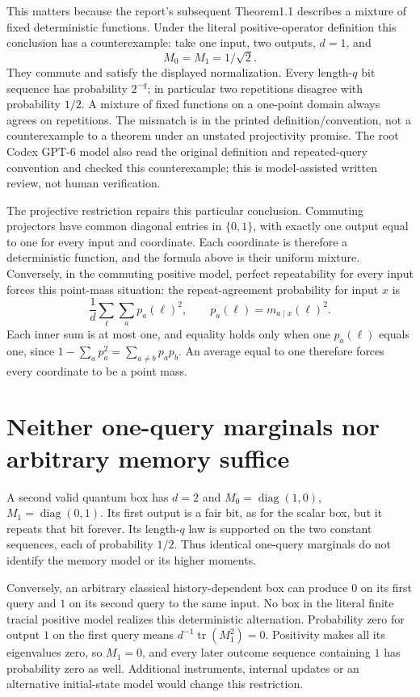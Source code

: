 \documentclass[11pt]{article}
\begin{document}
This matters because the report's subsequent Theorem1.1 describes
a mixture of fixed deterministic functions. Under the literal
positive-operator definition this conclusion has a counterexample:
take one input, two outputs, $d=1$, and
\[
 M_0=M_1=1/\sqrt2.
\]
They commute and satisfy the displayed normalization. Every
length-$q$ bit sequence has probability $2^{-q}$; in particular
two repetitions disagree with probability $1/2$. A mixture of
fixed functions on a one-point domain always agrees on repetitions.
The mismatch is in the printed definition/convention, not a
counterexample to a theorem under an unstated projectivity promise.
The root Codex GPT-6 model also read the original definition and
repeated-query convention and checked this counterexample; this
is model-assisted written review, not human verification.

The projective restriction repairs this particular conclusion.
Commuting projectors have common diagonal entries in $\{0,1\}$,
with exactly one output equal to one for every input and coordinate.
Each coordinate is therefore a deterministic function, and the
formula above is their uniform mixture. Conversely, in the
commuting positive model, perfect repeatability for every input
forces this point-mass situation: the repeat-agreement probability
for input $x$ is
\[
 \frac1d\sum_\ell\sum_a p_a(\ell)^2,
 \qquad p_a(\ell)=m_{a\mid x}(\ell)^2.
\]
Each inner sum is at most one, and equality holds only when one
$p_a(\ell)$ equals one, since
$1-\sum_a p_a^2=\sum_{a\ne b}p_ap_b$. An average equal to one
therefore forces every coordinate to be a point mass.

\section{Neither one-query marginals nor arbitrary memory suffice}
A second valid quantum box has $d=2$ and
$M_0=\operatorname{diag}(1,0)$,
$M_1=\operatorname{diag}(0,1)$. Its first output is a fair bit,
as for the scalar box, but it repeats that bit forever. Its
length-$q$ law is supported on the two constant sequences,
each of probability $1/2$. Thus identical one-query marginals
do not identify the memory model or its higher moments.

Conversely, an arbitrary classical history-dependent box can
produce $0$ on its first query and $1$ on its second query to
the same input. No box in the literal finite tracial positive
model realizes this deterministic alternation. Probability zero
for output $1$ on the first query means
$d^{-1}\operatorname{tr}(M_1^2)=0$. Positivity makes all its
eigenvalues zero, so $M_1=0$, and every later outcome sequence
containing $1$ has probability zero as well. Additional
instruments, internal updates or an alternative initial-state
model would change this restriction.
\end{document}

